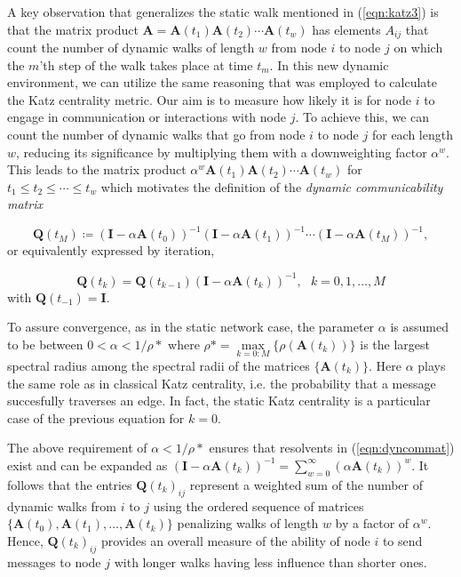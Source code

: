 A key observation that generalizes the static walk mentioned in (\ref{eqn:katz3}) is that the matrix product $\mathbf{A} = \mathbf{A}(t_1)\mathbf{A}(t_2)\cdots \mathbf{A}(t_w)$ has elements $A_{ij}$ that count the number of dynamic walks of length $w$ from node $i$ to node $j$ on which the $m$'th step of the walk takes place at time $t_m$. In this new dynamic environment, we can utilize the same reasoning that was employed to calculate the Katz centrality metric. Our aim is to measure how likely it is for node $i$ to engage in communication or interactions with node $j$. To achieve this, we can count the number of dynamic walks that go from node $i$ to node $j$ for each length $w$, reducing its significance by multiplying them with a downweighting factor $\alpha^w$. This leads to the matrix product $\alpha^w\mathbf{A}(t_1)\mathbf{A}(t_2)\cdots \mathbf{A}(t_w)$ for $t_1\le t_2\le \cdots \le t_w$ which motivates the definition of the \textit{dynamic communicability matrix}

\begin{equation}
\label{eqn:dyncommat}
    \mathbf{Q}(t_M) \coloneqq (\mathbf{I} - \alpha\mathbf{A}(t_0))^{-1} (\mathbf{I} - \alpha\mathbf{A}(t_1))^{-1} \cdots (\mathbf{I} - \alpha\mathbf{A}(t_M))^{-1},
\end{equation}
or equivalently expressed by iteration,

\begin{equation}
\label{eqn:dyncommatiter}
    \mathbf{Q}(t_k) = \mathbf{Q}(t_{k-1})(\mathbf{I} - \alpha\mathbf{A}(t_k))^{-1} , ~~~k=0,1,\dots,M
\end{equation}
with $\mathbf{Q}(t_{-1})=\mathbf{I}$.

To assure convergence, as in the static network case, the parameter $\alpha$ is assumed to be between $0<\alpha<1/\rho*$ where $\rho* = \underset{k=0:M}{\max}\{\rho(\mathbf{A}(t_k))\}$ is the largest spectral radius among the spectral radii of the matrices $\{\mathbf{A}(t_k)\}$. Here $\alpha$ plays the same role as in classical Katz centrality, i.e. the probability that a message succesfully traverses an edge. In fact, the static Katz centrality is a particular case of the previous equation for $k=0$.

The above requirement of $\alpha < 1/\rho*$ ensures that resolvents in (\ref{eqn:dyncommat}) exist and can be expanded as $(\mathbf{I} - \alpha\mathbf{A}(t_k))^{-1} = \sum_{w=0}^{\infty} (\alpha \mathbf{A}(t_k))^w$. It follows that the entries $\mathbf{Q}(t_k)_{ij}$ represent a weighted sum of the number of dynamic walks from $i$ to $j$ using the ordered sequence of matrices $\{\mathbf{A}(t_0),\mathbf{A}(t_1),\dots,\mathbf{A}(t_k)\}$ penalizing walks of length $w$ by a factor of $\alpha^w$. Hence, $\mathbf{Q}(t_k)_{ij}$ provides an overall measure of the ability of node $i$ to send messages to node $j$ with longer walks having less influence than shorter ones.

